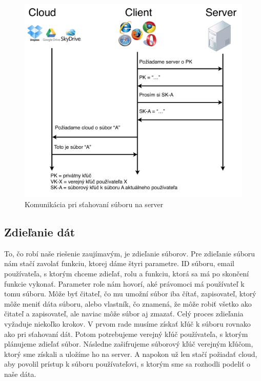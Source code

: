		\begin{figure}[H]
			\begin{center}
				\includegraphics[width=1\linewidth]{images/stahovanie_com.png}
				\caption{Komunikácia pri sťahovaní súboru na server}
			\end{center}
		\end{figure}
	
	\subsection{Zdieľanie dát}
		
		To, čo robí naše riešenie zaujímavým, je zdieľanie súborov. Pre zdieľanie súboru nám stačí zavolať funkciu, ktorej dáme štyri parametre. ID súboru, email používateľa, s ktorým chceme zdieľať, rolu a funkciu, ktorá sa má po skončení funkcie vykonať. Parameter role nám hovorí, aké právomoci má používateľ k tomu súboru. Môže byť čitateľ, čo mu umožní súbor iba čítať, zapisovateľ, ktorý môže meniť dáta súboru, alebo vlastník, čo znamená, že môže robiť všetko ako čitateľ a zapisovateľ, ale naviac môže súbor aj zmazať. Celý proces zdieľania vyžaduje niekoľko krokov. V prvom rade musíme získať kľúč k súboru rovnako ako pri sťahovaní dát. Potom potrebujeme verejný kľúč používateľa, s ktorým plánujeme zdieľať súbor. Následne zašifrujeme súborový kľúč verejným kľúčom, ktorý sme získali a uložíme ho na server. A napokon už len stačí požiadať cloud, aby povolil prístup k súboru používateľovi, s ktorým sme sa rozhodli podeliť o naše dáta.
		

